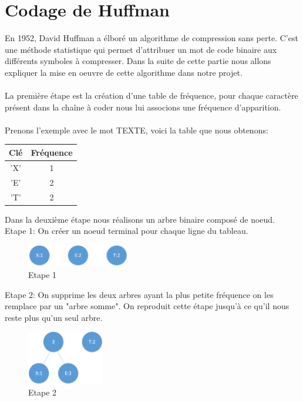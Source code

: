 \documentclass[12pt,a4paper]{report}
\begin{document}
	\chapter*{Codage de Huffman}
	En 1952, David Huffman a élboré un algorithme de compression sans perte. C'est une méthode statistique qui permet d'attribuer un mot de code binaire aux différents symboles à compresser. Dans la suite de cette partie nous allons expliquer la mise en oeuvre de cette algorithme dans notre projet. \\\\
	La première étape est la création d'une table de fréquence, pour chaque caractère présent dans la chaîne à coder nous lui associons une fréquence d'apparition.\\\\ Prenons l'exemple avec le mot TEXTE, voici la table que nous obtenons:\newline
	\begin{center}
	\begin{tabular}{|c|c|}
		\hline
		Clé & Fréquence\\
		\hline
		'X' & 1 \\
		'E' & 2 \\
		'T' & 2 \\
		\hline
	\end{tabular}
	\end{center}
	Dans la deuxième étape nous réalisons un arbre binaire composé de noeud. \\
	Etape 1: On créer un noeud terminal pour chaque ligne du tableau.
	\begin{center}
	\begin{figure}[!h]
	\centering
	\includegraphics[width=0.40\textwidth]{etape1.png}
	\caption{Etape 1}
	\end{figure}
	\end{center}
	Etape 2: On supprime les deux arbres ayant la plus petite fréquence on les remplace par un "arbre somme". On reproduit cette étape jusqu'à ce qu'il nous reste plus qu'un seul arbre. 
	\begin{center}
	\begin{figure}[!h]
	\centering
	\includegraphics[width=0.30\textwidth]{etape2.png}
	\caption{Etape 2}
	\end{figure}
	\end{center}
\end{document}
